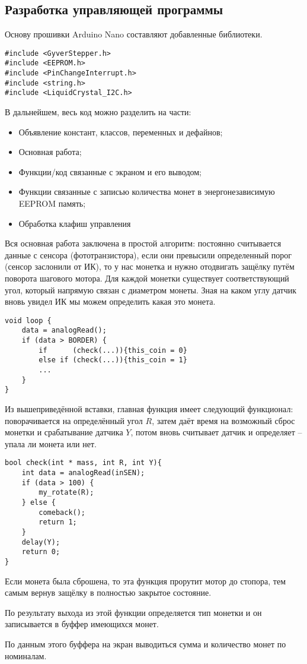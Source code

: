 \subsection{Разработка управляющей программы}

Основу прошивки Arduino Nano составляют добавленные библиотеки.

\begin{lstlisting}[frame=single]
#include <GyverStepper.h>
#include <EEPROM.h>
#include <PinChangeInterrupt.h>
#include <string.h>
#include <LiquidCrystal_I2C.h>
\end{lstlisting}

В дальнейшем, весь код можно разделить на части:

\begin{itemize}
	\item Объявление констант, классов, переменных и дефайнов;
	\item Основная работа;
	\item Функции/код связанные с экраном и его выводом;
	\item Функции связанные с записью количества монет в энергонезависимую EEPROM память;
	\item Обработка клафиш управления
\end{itemize}

Вся основная работа заключена в простой алгоритм: постоянно считывается данные с сенсора (фототранзистора), если они превысили определенный порог (сенсор заслонили от ИК), то у нас монетка и нужно отодвигать защёлку путём поворота шагового мотора. Для каждой монетки существует соответствующий угол, который напрямую связан с диаметром монеты. Зная на каком углу датчик вновь увидел ИК мы можем определить какая это монета.

\begin{lstlisting}[frame=single]
void loop {
	data = analogRead();
	if (data > BORDER) {
		if      (check(...)){this_coin = 0}
		else if (check(...)){this_coin = 1}
		...
	}
}
\end{lstlisting}

Из вышеприведённой вставки, главная функция имеет следующий функционал: поворачивается на определённый угол $R$, затем даёт время на возможный сброс монетки и срабатывание датчика $Y$, потом вновь считывает датчик и определяет -- упала ли монета или нет. 
\par\medskip

\begin{lstlisting}[frame=single]
bool check(int * mass, int R, int Y){
	int data = analogRead(inSEN);
	if (data > 100) {
		my_rotate(R);
	} else {
		comeback();
		return 1;
	}
	delay(Y);
	return 0;
}
\end{lstlisting}
Если монета была сброшена, то эта функция прорутит мотор до стопора, тем самым вернув защёлку в полностью закрытое состояние.
\par\medskip

По результату выхода из этой функции определяется тип монетки и он записывается в буффер имеющихся монет.
\par\medskip

По данным этого буффера на экран выводиться сумма и количество монет по номиналам.
\par\medskip